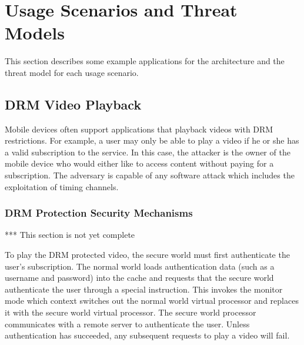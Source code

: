\section{Usage Scenarios and Threat Models}

    This section describes some example applications for the architecture and 
    the threat model for each usage scenario.

    \subsection{DRM Video Playback}
    Mobile devices often support applications that playback videos with
    DRM restrictions. For example, a user may only be able to play a video if 
    he or she has a valid subscription to the service. In this case, the 
    attacker is the owner of the mobile device who would either like to access 
    content without paying for a subscription. The adversary is capable of any 
    software attack which includes the exploitation of timing channels.


    \subsubsection{DRM Protection Security Mechanisms}

    *** This section is not yet complete

    To play the DRM protected video, the secure world must first authenticate 
    the user's subscription. The normal world loads authentication data (such 
    as a username and password) into the cache and requests that the secure 
    world authenticate the user through a special instruction. This invokes the 
    monitor mode which context switches out the normal world virtual processor 
    and replaces it with the secure world virtual processor. The secure world 
    processor communicates with a remote server to authenticate the user.  
    Unless authentication has succeeded, any subsequent requests to play a 
    video will fail.

